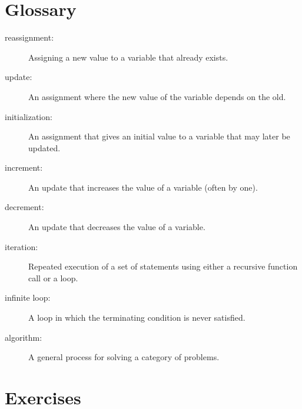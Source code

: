 \section{Glossary}

\begin{description}

\item[reassignment:] Assigning a new value to a variable that
already exists.

\item[update:] An assignment where the new value of the variable
depends on the old.

\item[initialization:] An assignment that gives an initial value to
a variable that may later be updated.

\item[increment:] An update that increases the value of a variable
(often by one).

\item[decrement:] An update that decreases the value of a variable.

\item[iteration:] Repeated execution of a set of statements using
either a recursive function call or a loop.

\item[infinite loop:] A loop in which the terminating condition is
never satisfied.

\item[algorithm:]  A general process for solving a category of
problems.

\end{description}


\section{Exercises}

